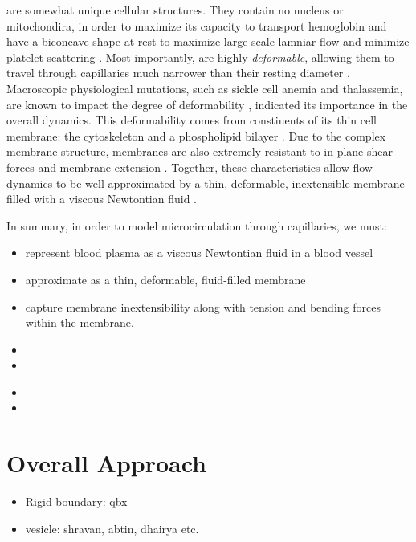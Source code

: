 \rbcs are somewhat unique cellular structures. 
They contain no nucleus or mitochondira, in order to maximize its capacity to transport hemoglobin \cite{zhang2011red} and have a biconcave shape at rest to maximize large-scale lamniar flow and minimize platelet scattering \cite{uzoigwe2006human}.
Most importantly, \rbcs are highly \textit{deformable}, allowing them to travel through capillaries much narrower than their resting diameter \cite{huisjes2018squeezing}.
Macroscopic physiological mutations, such as sickle cell anemia and thalassemia, are known to impact the degree of \rbc deformability \cite{huisjes2018squeezing}, indicated its importance in the overall dynamics.
This deformability comes from constiuents of its thin cell membrane: the cytoskeleton and a phospholipid bilayer .
Due to the complex membrane structure, \rbc membranes are also extremely resistant to in-plane shear forces and membrane extension \cite{lee2008theoretical}.
Together, these characteristics allow \rbc flow dynamics to be well-approximated by a thin, deformable, inextensible membrane filled with a viscous Newtontian fluid .

In summary, in order to model microcirculation through capillaries, we must:
\begin{itemize}
    \item represent blood plasma as a viscous Newtontian fluid in a blood vessel
    \item approximate \rbcs as a thin, deformable, fluid-filled membrane 
    \item capture \rbc membrane inextensibility along with tension and bending forces within the membrane.
\end{itemize}
\begin{itemize}
    \item {}
    \item {}
\end{itemize}
\begin{itemize}
    \item {}
    \item {}
\end{itemize}

\section{Overall Approach}
\begin{itemize}
    \item Rigid boundary: qbx
    \item vesicle: shravan, abtin, dhairya etc.
\end{itemize}
